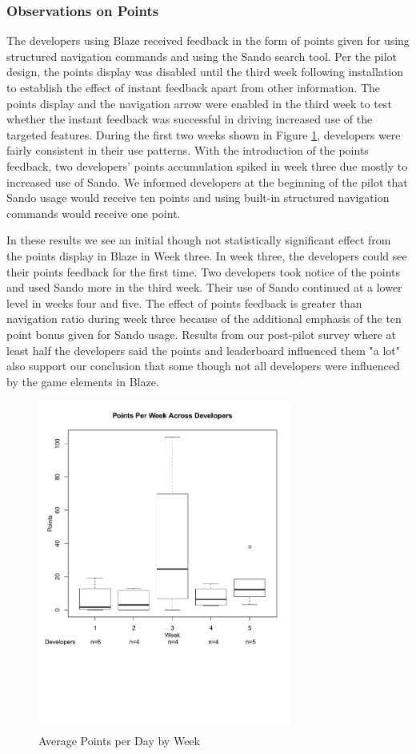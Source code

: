 \documentclass{sig-alternate}
\begin{document}
\subsubsection{Observations on Points}

The developers using Blaze received feedback in the form of points given for using structured navigation commands and using the Sando search tool\cite{Shepherd2012Sando}.  Per the pilot design, the points display was disabled until the third week following installation to establish the effect of instant feedback apart from other information.  The points display and the navigation arrow were enabled in the third week to test whether the instant feedback was successful in driving increased use of the targeted features. During the first two weeks shown in Figure \ref{fig:pointsbyweek}, developers were fairly consistent in their use patterns.  With the introduction of the points feedback, two developers' points accumulation spiked in week three due mostly to increased use of Sando.   We informed developers at the beginning of the pilot that Sando usage would receive ten points and using built-in structured navigation commands would receive one point.  

In these results we see an initial though not statistically significant effect from the points display in Blaze in Week three.  In week three, the developers could see their points feedback for the first time.  Two developers took notice of the points and used Sando more in the third week.  Their use of Sando continued at a lower level in weeks four and five.   The effect of points feedback is greater than navigation ratio during week three because of the additional emphasis of the ten point bonus given for Sando usage.  Results from our post-pilot survey where at least half the developers said the points and leaderboard influenced them "a lot" also support our conclusion that some though not all developers were influenced by the game elements in Blaze.  

\begin{figure}
	\includegraphics[width=3.3in]{pointsbyweek_ann.pdf}
	\caption{Average Points per Day by Week}
	\label{fig:pointsbyweek}
\end{figure}
\end{document}
